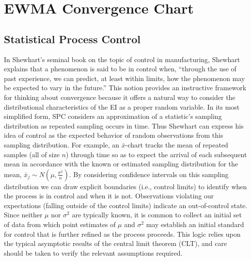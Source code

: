 \documentclass{article}
\begin{document}
%
%
\section{EWMA Convergence Chart}
\label{sec:convergence}
%
%

%
%
\subsection{Statistical Process Control}
%
%

%
In Shewhart's seminal book \citep{shewhartBook} on the topic of control in 
manufacturing, Shewhart explains that a phenomenon is said to be in control 
when, ``through the use of past experience, we can predict, at least within 
limits, how the phenomenon may be expected to vary in the future.'' This 
notion provides an instructive framework for thinking about convergence 
because it offers a natural way to consider the distributional characteristics 
of the EI as a proper random variable. In its most simplified form, SPC 
considers an approximation of a statistic's sampling distribution as repeated 
sampling occurs in time. Thus Shewhart can express his idea of control as the 
expected behavior of random observations from this sampling distribution. For 
example, an $\bar x$-chart tracks the mean of repeated samples (all of size 
$n$) through time so as to expect the arrival of each subsequent mean in 
accordance with the known or estimated sampling distribution for the mean, 
$\bar{x}_j \sim N\left(\mu, \frac{\sigma^2}{n}\right)$. By considering 
confidence intervals on this sampling distribution we can draw explicit 
boundaries (i.e., control limits) to identify when the process is in control 
and when it is not. Observations violating our expectations (falling outside 
of the control limits) indicate an out-of-control state. Since neither $\mu$ 
nor $\sigma^2$ are typically known, it is common to collect an initial set of 
data from which point estimates of $\mu$ and $\sigma^2$ may establish an 
initial standard for control that is further refined as the process proceeds. 
This logic relies upon the typical asymptotic results of the 
central limit theorem (CLT), and care should be taken to verify the relevant 
assumptions required. 
\end{document}
